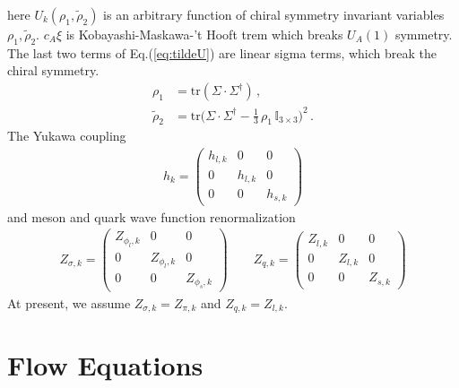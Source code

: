 \documentclass[12pt]{article}
\begin{document}
here $U_k(\rho_1,\tilde{\rho}_2)$ is an arbitrary function of chiral symmetry invariant variables $\rho_1,\tilde{\rho}_2$.  $ c_A \xi$ is Kobayashi-Maskawa-’t Hooft trem which breaks $U_A(1)$ symmetry. The last two terms of Eq.(\ref{eq:tildeU}) are linear sigma terms, which break the chiral symmetry.
\begin{align}
  \rho_1&=\text{tr}(\Sigma \cdot \Sigma^\dagger)\,, \label{eq:rho1}\\[2ex]
  \tilde{\rho}_2&=\text{tr}\Big(\Sigma \cdot \Sigma^\dagger-\frac{1}{3}\,\rho_1\,\mathbb{I}_{3\times 3}\Big)^2 \,.\label{eq:rho2}
\end{align}
The Yukawa coupling 
\begin{align}
h_k=\begin{pmatrix} 
h_{l,k}&0&0\\
0&h_{l,k}&0\\
0&0&h_{s,k}
\end{pmatrix}
\end{align}
and meson and quark wave function renormalization
\begin{align}
Z_{\sigma,k}=\begin{pmatrix} 
Z_{\phi_l,k}&0&0\\
0&Z_{\phi_l,k}&0\\
0&0&Z_{\phi_s,k}
\end{pmatrix} 
\quad \quad
Z_{q,k}=\begin{pmatrix} 
Z_{l,k}&0&0\\
0&Z_{l,k}&0\\
0&0&Z_{s,k}
\end{pmatrix} 
\end{align}
At present, we assume $Z_{\sigma,k}=Z_{\pi,k}$ and $Z_{q,k}=Z_{l,k}$.

\section{Flow Equations}
\end{document}
